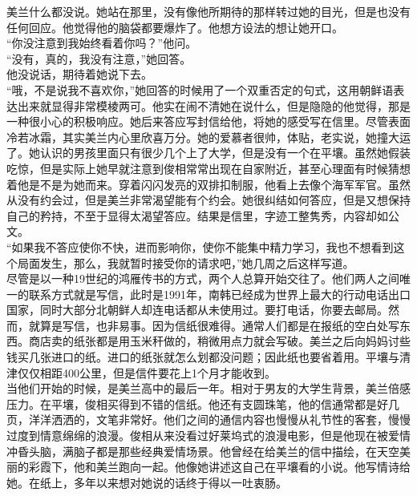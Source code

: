 美兰什么都没说。她站在那里，没有像他所期待的那样转过她的目光，但是也没有任何回应。他觉得他的脑袋都要爆炸了。他想方设法的想让她开口。\\

“你没注意到我始终看着你吗？”他问。\\

“没有，真的，我没有注意，”她回答。\\

他没说话，期待着她说下去。\\

“哦，不是说我不喜欢你，”她回答的时候用了一个双重否定的句式，这用朝鲜语表达出来就显得非常模棱两可。他实在闹不清她在说什么，但是隐隐的他觉得，那是一种很小心的积极响应。她后来答应写封信给他，将她的感受写在信里。尽管表面冷若冰霜，其实美兰内心里欣喜万分。她的爱慕者很帅，体贴，老实说，她撞大运了。她认识的男孩里面只有很少几个上了大学，但是没有一个在平壤。虽然她假装吃惊，但是实际上她早就注意到俊相常常出现在自家附近，甚至心理面有时候猜想着他是不是为她而来。穿着闪闪发亮的双排扣制服，他看上去像个海军军官。虽然从没有约会过，但是美兰非常渴望能有个约会。她很纠结如何答应，但是又想保持自己的矜持，不至于显得太渴望答应。结果是信里，字迹工整隽秀，内容却如公文。\\

“如果我不答应使你不快，进而影响你，使你不能集中精力学习，我也不想看到这个局面发生，那么，我就暂时接受你的请求吧，”她几周之后这样写道。\\

尽管是以一种19世纪的鸿雁传书的方式，两个人总算开始交往了。他们两人之间唯一的联系方式就是写信，此时是1991年，南韩已经成为世界上最大的行动电话出口国家，同时大部分北朝鲜人却连电话都从未使用过。要打电话，你要去邮局。然而，就算是写信，也非易事。因为信纸很难得。通常人们都是在报纸的空白处写东西。商店卖的纸张都是用玉米秆做的，稍微用点力就会写破。美兰之后向妈妈讨些钱买几张进口的纸。进口的纸张就怎么划都没问题；因此纸也要省着用。平壤与清津仅仅相距400公里，但是信件要花上1个月才能收到。\\

当他们开始的时候，是美兰高中的最后一年。相对于男友的大学生背景，美兰倍感压力。在平壤，俊相买得到不错的信纸。他还有支圆珠笔，他的信通常都是好几页，洋洋洒洒的，文笔非常好。他们之间的通信内容也慢慢从礼节性的客套，慢慢过度到情意绵绵的浪漫。俊相从来没看过好莱坞式的浪漫电影，但是他现在被爱情冲昏头脑，满脑子都是那些经典爱情场景。他曾经在给美兰的信中描绘，在天空美丽的彩霞下，他和美兰跑向一起。他像她讲述这自己在平壤看的小说。他写情诗给她。在纸上，多年以来想对她说的话终于得以一吐衷肠。\\

